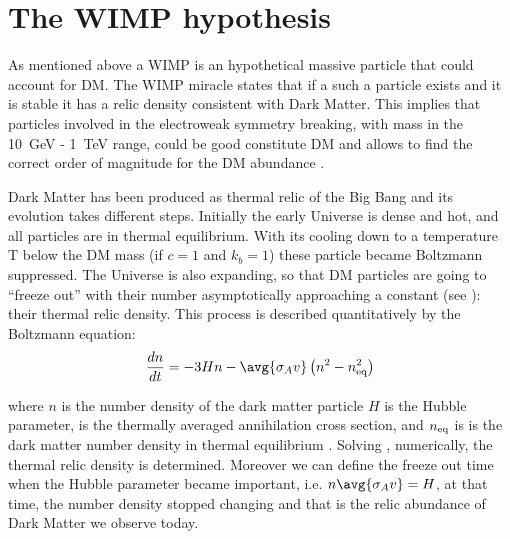 \section{The WIMP hypothesis}
\label{sec:wimp}
As mentioned above a WIMP is an hypothetical massive particle that could account for DM. The WIMP miracle states that if a such a particle exists and it is stable it has a relic density consistent with Dark Matter. This implies that particles involved in the electroweak symmetry breaking, with mass in the \SI{10}{\GeV} - \SI{1}{\TeV} range, could be good constitute DM and allows to find the correct order of magnitude for the DM abundance \cite{DMcollider}.

Dark Matter has been produced as thermal relic of the Big Bang and its evolution takes different steps. Initially the early Universe is dense and hot, and all particles are in thermal equilibrium. With its cooling down to a temperature T below the DM mass (if $c=1$ and $k_b=1$) these particle became Boltzmann suppressed. The Universe is also expanding, so that DM particles are going to ``freeze out'' with their number asymptotically approaching a constant (see \Fig{\ref{fig:Freezeout}}): their thermal relic density. This process is described quantitatively by the Boltzmann equation:
\begin{equation}
\frac{dn}{dt}=-3Hn-\avg{\sigma_A v}\left(n^2-n_{\textup{eq}}^2\right)
\label{eqn:boltz}
\end{equation}

where $n$ is the number density of the dark matter particle $H$ is the Hubble parameter,  is the thermally averaged annihilation cross section, and $n_{\textup{eq}}$ is is the dark matter number density in thermal equilibrium \cite{feng:DM}. Solving \Eqn{\ref{eqn:boltz}}, numerically, the thermal relic density is determined. Moreover we can define the freeze out time when the Hubble parameter became important, i.e. $n\avg{\sigma_A v}= H$, at that time, the number density stopped changing and that is the relic abundance of Dark Matter we observe today.

